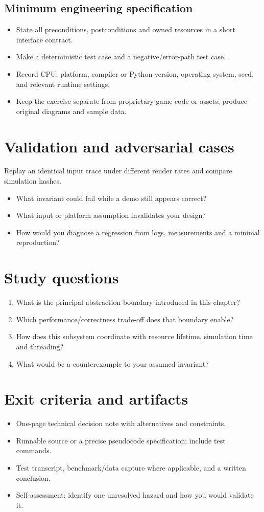 \documentclass[11pt,letterpaper]{article}
\begin{document}
\subsection{Minimum engineering specification}
\begin{itemize}
\item State all preconditions, postconditions and owned resources in a short interface contract.
\item Make a deterministic test case and a negative/error-path test case.
\item Record CPU, platform, compiler or Python version, operating system, seed, and relevant runtime settings.
\item Keep the exercise separate from proprietary game code or assets; produce original diagrams and sample data.
\end{itemize}
\section{Validation and adversarial cases}
Replay an identical input trace under different render rates and compare simulation hashes.

\begin{itemize}
\item What invariant could fail while a demo still appears correct?
\item What input or platform assumption invalidates your design?
\item How would you diagnose a regression from logs, measurements and a minimal reproduction?
\end{itemize}
\section{Study questions}
\begin{enumerate}
\item What is the principal abstraction boundary introduced in this chapter?
\item Which performance/correctness trade-off does that boundary enable?
\item How does this subsystem coordinate with resource lifetime, simulation time and threading?
\item What would be a counterexample to your assumed invariant?
\end{enumerate}
\section{Exit criteria and artifacts}
\begin{itemize}
\item One-page technical decision note with alternatives and constraints.
\item Runnable source or a precise pseudocode specification; include test commands.
\item Test transcript, benchmark/data capture where applicable, and a written conclusion.
\item Self-assessment: identify one unresolved hazard and how you would validate it.
\end{itemize}
\end{document}
